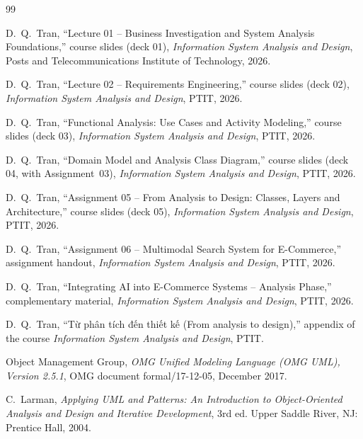 \clearpage
{}
{}
\renewcommand{\bibname}{References}
\begin{thebibliography}{99}
\small

 D.~Q.~Tran, ``Lecture 01 -- Business Investigation and System Analysis Foundations,'' course
slides (deck 01), \emph{Information System Analysis and Design}, Posts and Telecommunications Institute of
Technology, 2026.

 D.~Q.~Tran, ``Lecture 02 -- Requirements Engineering,'' course slides (deck 02),
\emph{Information System Analysis and Design}, PTIT, 2026.

 D.~Q.~Tran, ``Functional Analysis: Use Cases and Activity Modeling,'' course slides (deck 03),
\emph{Information System Analysis and Design}, PTIT, 2026.

 D.~Q.~Tran, ``Domain Model and Analysis Class Diagram,'' course slides (deck 04, with
Assignment~03), \emph{Information System Analysis and Design}, PTIT, 2026.

 D.~Q.~Tran, ``Assignment 05 -- From Analysis to Design: Classes, Layers and Architecture,''
course slides (deck 05), \emph{Information System Analysis and Design}, PTIT, 2026.

 D.~Q.~Tran, ``Assignment 06 -- Multimodal Search System for E-Commerce,'' assignment
handout, \emph{Information System Analysis and Design}, PTIT, 2026.

 D.~Q.~Tran, ``Integrating AI into E-Commerce Systems -- Analysis Phase,'' complementary
material, \emph{Information System Analysis and Design}, PTIT, 2026.

 D.~Q.~Tran, ``Từ phân tích đến thiết kế (From analysis to design),'' appendix of the
course \emph{Information System Analysis and Design}, PTIT.

 Object Management Group, \emph{OMG Unified Modeling Language (OMG UML), Version 2.5.1}, OMG document
formal/17-12-05, December 2017.

 C.~Larman, \emph{Applying UML and Patterns: An Introduction to Object-Oriented Analysis and Design
and Iterative Development}, 3rd ed. Upper Saddle River, NJ: Prentice Hall, 2004.


\end{thebibliography}
